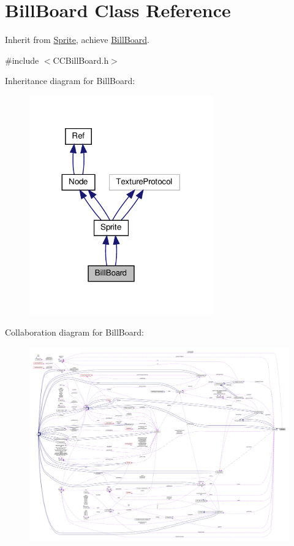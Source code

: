 \hypertarget{classBillBoard}{}\section{Bill\+Board Class Reference}
\label{classBillBoard}


Inherit from \hyperlink{classSprite}{Sprite}, achieve \hyperlink{classBillBoard}{Bill\+Board}.  




{\ttfamily \#include $<$C\+C\+Bill\+Board.\+h$>$}



Inheritance diagram for Bill\+Board\+:
\nopagebreak
\begin{figure}[H]
\begin{center}
\leavevmode
\includegraphics[width=224pt]{classBillBoard__inherit__graph}
\end{center}
\end{figure}


Collaboration diagram for Bill\+Board\+:
\nopagebreak
\begin{figure}[H]
\begin{center}
\leavevmode
\includegraphics[width=350pt]{classBillBoard__coll__graph}
\end{center}
\end{figure}
